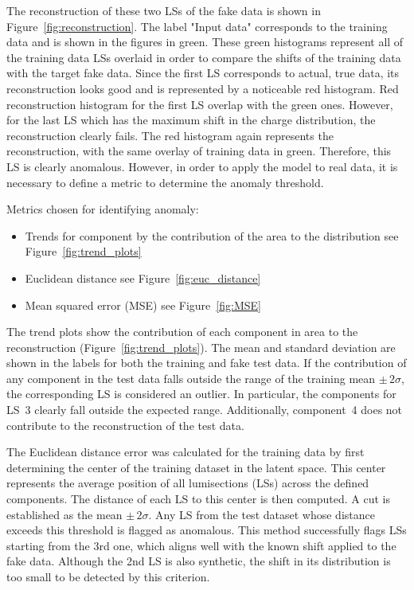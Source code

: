 The reconstruction of these two LSs of the fake data is shown in Figure~\ref{fig:reconstruction}. The label "Input data" corresponds to the training data and is shown in the figures in green. These green histograms represent all of the training data LSs overlaid in order to compare the shifts of the training data with the target fake data. Since the first LS corresponds to actual, true data, its reconstruction looks good and is represented by a noticeable red histogram. Red reconstruction histogram for the first LS overlap with the green ones. However, for the last LS which has the maximum shift in the charge distribution, the reconstruction clearly fails. The red histogram again represents the reconstruction, with the same overlay of training data in green. Therefore, this LS is clearly anomalous. However, in order to apply the model to real data, it is necessary to define a metric to determine the anomaly threshold.

Metrics chosen for identifying anomaly:
\begin{itemize}
    \item Trends for component by the contribution of the area to the distribution see Figure~\ref{fig:trend_plots}
    \item Euclidean distance see Figure~\ref{fig:euc_distance}
    \item Mean squared error (MSE) see Figure~\ref{fig:MSE}
\end{itemize}

The trend plots show the contribution of each component in area to the reconstruction (Figure~\ref{fig:trend_plots}). The mean and standard deviation are shown in the labels for both the training and fake test data. If the contribution of any component in the test data falls outside the range of the training mean \( \pm\,2\sigma \), the corresponding LS is considered an outlier. In particular, the components for LS~3 clearly fall outside the expected range. Additionally, component~4 does not contribute to the reconstruction of the test data.

The Euclidean distance error was calculated for the training data by first determining the center of the training dataset in the latent space. This center represents the average position of all lumisections (LSs) across the defined components. The distance of each LS to this center is then computed. A cut is established as the mean \( \pm\,2\sigma \). Any LS from the test dataset whose distance exceeds this threshold is flagged as anomalous. This method successfully flags LSs starting from the 3rd one, which aligns well with the known shift applied to the fake data. Although the 2nd LS is also synthetic, the shift in its distribution is too small to be detected by this criterion.

